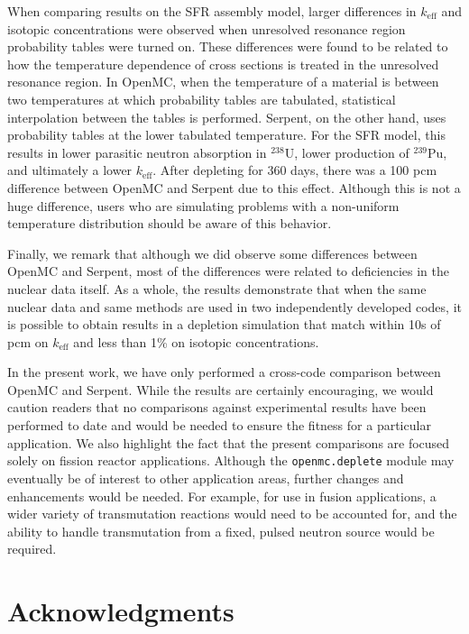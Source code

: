 \documentclass[3p,authoryear]{elsarticle}
\begin{document}
When comparing results on the SFR assembly model, larger differences in
$k_\text{eff}$ and isotopic concentrations were observed when unresolved
resonance region probability tables were turned on. These differences were found
to be related to how the temperature dependence of cross sections is treated in
the unresolved resonance region. In OpenMC, when the temperature of a material
is between two temperatures at which probability tables are tabulated,
statistical interpolation between the tables is performed. Serpent, on the other
hand, uses probability tables at the lower tabulated temperature. For the SFR
model, this results in lower parasitic neutron absorption in $^{238}$U, lower
production of $^{239}$Pu, and ultimately a lower $k_\text{eff}$. After depleting
for 360 days, there was a 100 pcm difference between OpenMC and Serpent due to
this effect. Although this is not a huge difference, users who are simulating
problems with a non-uniform temperature distribution should be aware of this
behavior.

Finally, we remark that although we did observe some differences between OpenMC
and Serpent, most of the differences were related to deficiencies in the nuclear
data itself. As a whole, the results demonstrate that when the same nuclear data
and same methods are used in two independently developed codes, it is possible
to obtain results in a depletion simulation that match within 10s of pcm on
$k_\text{eff}$ and less than 1\% on isotopic concentrations.

In the present work, we have only performed a cross-code comparison between
OpenMC and Serpent. While the results are certainly encouraging, we would
caution readers that no comparisons against experimental results have been
performed to date and would be needed to ensure the fitness for a particular
application. We also highlight the fact that the present comparisons are focused
solely on fission reactor applications. Although the \texttt{openmc.deplete}
module may eventually be of interest to other application areas, further changes
and enhancements would be needed. For example, for use in fusion applications, a
wider variety of transmutation reactions would need to be accounted for, and the
ability to handle transmutation from a fixed, pulsed neutron source would be
required.

\section*{Acknowledgments}
\end{document}
